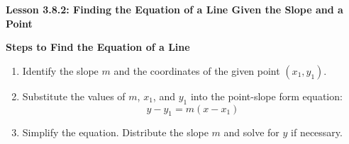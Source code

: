  \begin{center}
\textbf{Lesson 3.8.2: Finding the Equation of a Line Given the Slope and a Point}
\end{center}

\vspace*{1ex}

\noindent\textbf{Steps to Find the Equation of a Line}

\begin{enumerate}
    \item Identify the slope $m$ and the coordinates of the given point $(x_1, y_1)$.
    \item Substitute the values of $m$, $x_1$, and $y_1$ into the point-slope form equation:
    \[
    y - y_1 = m(x - x_1)
    \]
    \item Simplify the equation. Distribute the slope $m$ and solve for $y$ if necessary.
\end{enumerate}

